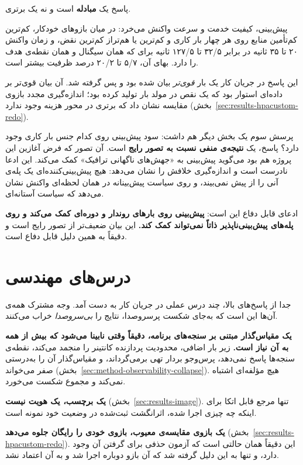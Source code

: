 پاسخ یک \textbf{مبادله} است و نه یک برتری.

پیش‌بینی، کیفیت خدمت و سرعت واکنش می‌خرد: در میان بازوهای خودکار، کم‌ترین کم‌تأمین منابع
روی هر چهار بار کاری و کم‌ترین یا هم‌تراز کم‌ترین نقض، و زمان واکنش ۲۰ تا ۳۵ ثانیه در برابر
۳۲/۵ تا ۱۲۷/۵ ثانیه برای  که همان سیگنال و همان نقطه‌ی هدف را دارد. بهای
آن، ۵/۷ تا ۲۰/۲ درصد ظرفیت بیشتر است.

این پاسخ در جریان کار یک بار \emph{قوی‌تر} بیان شده بود و پس گرفته شد. آن بیان قوی‌تر بر
داده‌ای استوار بود که یک نقص در مولد بار تولید کرده بود؛ اندازه‌گیری مجدد بازوی مقایسه نشان
داد که برتری در محور هزینه وجود ندارد (بخش~\ref{sec:results-hpacustom-redo}).

پرسش سوم یک بخش دیگر هم داشت: سود پیش‌بینی روی کدام جنس بار کاری وجود دارد؟ پاسخ، یک
\textbf{نتیجه‌ی منفی نسبت به تصور رایج} است. آن تصور \mdash{} که فرض آغازین این پروژه هم بود
\mdash{} می‌گوید پیش‌بینی به «جهش‌های ناگهانی ترافیک» کمک می‌کند. این ادعا نادرست است و
اندازه‌گیری خلافش را نشان می‌دهد: هیچ پیش‌بینی‌کننده‌ای یک پله‌ی آنی را از پیش نمی‌بیند، و
روی  سیاست پیش‌بینانه در همان لحظه‌ای واکنش نشان می‌دهد که سیاست آستانه‌ای.

ادعای قابل دفاع این است: \textbf{پیش‌بینی روی بارهای روندار و دوره‌ای کمک می‌کند و روی
پله‌های پیش‌بینی‌ناپذیر ذاتاً نمی‌تواند کمک کند.} این بیان ضعیف‌تر از تصور رایج است و
دقیقاً به همین دلیل قابل دفاع است.

\section{درس‌های مهندسی}
\label{sec:conclusion-lessons}

جدا از پاسخ‌های بالا، چند درس عملی در جریان کار به دست آمد. وجه
مشترک همه‌ی آن‌ها این است که به‌جای شکست پرسروصدا، نتایج را \emph{بی‌سروصدا} خراب می‌کنند.

\textbf{یک مقیاس‌گذار مبتنی بر سنجه‌های برنامه، دقیقاً وقتی نابینا می‌شود که بیش از همه به آن
نیاز است.} زیر بار اضافی، محدودیت پردازنده کانتینر را منجمد می‌کند، نقطه‌ی سنجه‌ها پاسخ
نمی‌دهد، پرس‌وجو بردار تهی برمی‌گرداند، و مقیاس‌گذار آن را \mdash{} به‌درستی \mdash{} صفر می‌خواند
(بخش~\ref{sec:method-observability-collapse}). هیچ مؤلفه‌ای اشتباه نمی‌کند و مجموع شکست
می‌خورد.

\textbf{یک برچسب، یک هویت نیست} (بخش~\ref{sec:results-image}). تنها مرجع قابل اتکا برای اینکه
چه چیزی اجرا شده، اثرانگشت ثبت‌شده در وضعیت خود نمونه است.

\textbf{یک بازوی مقایسه‌ی معیوب، بازوی خودی را رایگان جلوه می‌دهد}
(بخش~\ref{sec:results-hpacustom-redo}). این دقیقاً همان حالتی است که آزمون حذفی برای گرفتن آن
وجود دارد، و تنها به این دلیل گرفته شد که آن بازو دوباره اجرا شد و به آن اعتماد نشد.

